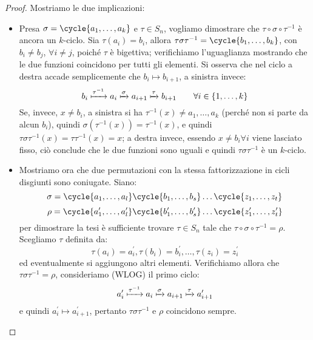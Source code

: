 \documentclass[11pt]{scrartcl}
\begin{document}
\begin{proof}
    Mostriamo le due implicazioni:
        \begin{itemize}
            \item Presa $\sigma = \cycle{a_1,\ldots,a_k}$ e $\tau \in S_n$, vogliamo dimostrare che $\tau\circ\sigma\circ\tau^{-1}$ è ancora un $k$-ciclo.
                Sia $\tau(a_i) = b_i$, allora $\tau\sigma\tau^{-1} = \cycle{b_1,\ldots,b_k}$, con $b_i \ne b_j$, $\forall i \ne j$, poiché $\tau$ è bigettiva; verifichiamo
                l'uguaglianza mostrando che le due funzioni coincidono per tutti gli elementi. Si osserva che nel ciclo a destra accade semplicemente che $b_i \longmapsto b_{i+1}$, a sinistra invece:
                    \[ b_i \xmapsto{\tau^{-1}} a_i \xmapsto{\sigma} a_{i+1} \xmapsto{\tau} b_{i+1} \qquad \forall i \in \{1,\ldots,k\}
                        \]
                Se, invece, $x \ne b_i$, a sinistra si ha $\tau^{-1}(x) \ne a_1,\ldots,a_k$ (perché non si parte da alcun $b_i$), quindi $\sigma(\tau^{-1}(x)) = \tau^{-1}(x)$, e quindi
                $\tau\sigma\tau^{-1}(x) = \tau \tau^{-1} (x) = x$; a destra invece, essendo $x \ne b_i \forall i$ viene lasciato fisso, ciò conclude che le due funzioni sono uguali e quindi $\tau\sigma\tau^{-1}$ è un $k$-ciclo.
            \item Mostriamo ora che due permutazioni con la stessa fattorizzazione in cicli disgiunti sono coniugate. Siano:
                \[ \sigma = \cycle{a_1, \ldots, a_l}\cycle{b_1, \ldots, b_s} \ldots \cycle{z_1, \ldots, z_t}
                    \]\[ \rho = \cycle{a_1^{\prime}, \ldots, a_l^{\prime}}\cycle{b_1^{\prime}, \ldots, b_s^{\prime}} \ldots \cycle{z_1^{\prime}, \ldots, z_t^{\prime}}
                        \]
                per dimostrare la tesi è sufficiente trovare $\tau \in S_n$ tale che $\tau\circ\sigma\circ\tau^{-1} = \rho$. Scegliamo $\tau$ definita da:
                    \[ \tau(a_i) = a_i^{\prime}, \tau(b_i) = b_i^{\prime}, \ldots, \tau(z_i) = z_i^{\prime}
                        \]
                ed eventualmente si aggiungono altri elementi. Verifichiamo allora che $\tau\sigma\tau^{-1} = \rho$, consideriamo (WLOG) il primo ciclo:
                    \[ a_i^{\prime} \xmapsto{\tau^{-1}} a_i \xmapsto{\sigma} a_{i+1} \xmapsto{\tau} a_{i+1}^{\prime}
                        \]
                e quindi $a_i^{\prime} \longmapsto a_{i+1}^{\prime}$, pertanto $\tau\sigma\tau^{-1}$ e $\rho$ coincidono sempre.
        \end{itemize}
\end{proof}
\end{document}
